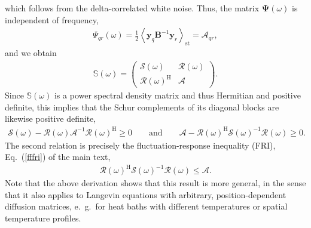 \documentclass[aps,pre,twocolumn,superscriptaddress,notitlepage]{revtex4-2}
\newcommand{\Av}[1]{\left\langle #1 \right\rangle}
\newcommand{\bmc}[1]{\bm{\mathcal{#1}}}
\renewcommand{\eqref}[1]{Eq.~(\ref{#1})}
\begin{document}
which follows from the delta-correlated white noise.
Thus, the matrix $\bm{\Psi}(\omega)$ is independent of frequency,
\begin{align}
\Psi_{qr}(\omega) = \frac{1}{2} \Av{\bm{y}_q \bm{B}^{-1} \bm{y}_r}_\text{st}  = \mathcal{A}_{qr},
\end{align}
and we obtain
\begin{align}
\mathbb{S}(\omega) = \begin{pmatrix} \bmc{S}(\omega) & \bmc{R}(\omega) \\ \bmc{R}(\omega)^\text{H} & \bmc{A} \end{pmatrix} .
\end{align}
Since $\mathbb{S}(\omega)$ is a power spectral density matrix and thus Hermitian and positive definite, this implies that the Schur complements of its diagonal blocks are likewise positive definite,
\begin{align}
\bmc{S}(\omega) - \bmc{R}(\omega) \bmc{A}^{-1} \bmc{R}(\omega)^\text{H} \geq 0 \qquad \text{and} \qquad \bmc{A} - \bmc{R}(\omega)^\text{H} \bmc{S}(\omega)^{-1} \bmc{R}(\omega) \geq 0 . \label{fffri-2}
\end{align}
The second relation is precisely the fluctuation-response inequality (FRI), \eqref{fffri} of the main text,
\begin{align}
\bmc{R}(\omega)^\text{H} \bmc{S}(\omega)^{-1} \bmc{R}(\omega) \leq \bmc{A} . \label{app-fffri}
\end{align}
Note that the above derivation shows that this result is more general, in the sense that it also applies to Langevin equations with arbitrary, position-dependent diffusion matrices, e.~g.~for heat baths with different temperatures or spatial temperature profiles.
\end{document}
